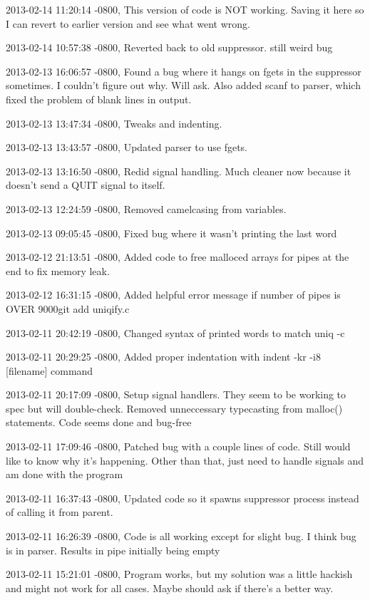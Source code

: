 \documentclass[letterpaper,10pt,titlepage]{article}
\begin{document}
\begin{enumerate}
2013-02-14 11:20:14 -0800, This version of code is NOT working. Saving it here so I can revert to earlier version and see what went wrong.

2013-02-14 10:57:38 -0800, Reverted back to old suppressor. still weird bug

2013-02-13 16:06:57 -0800, Found a bug where it hangs on fgets in the suppressor sometimes. I couldn't figure out why. Will ask. Also added scanf to parser, which fixed the problem of blank lines in output.

2013-02-13 13:47:34 -0800, Tweaks and indenting.

2013-02-13 13:43:57 -0800, Updated parser to use fgets.

2013-02-13 13:16:50 -0800, Redid signal handling. Much cleaner now because it doesn't send a QUIT signal to itself.

2013-02-13 12:24:59 -0800, Removed camelcasing from variables.

2013-02-13 09:05:45 -0800, Fixed bug where it wasn't printing the last word

2013-02-12 21:13:51 -0800, Added code to free malloced arrays for pipes at the end to fix memory leak.

2013-02-12 16:31:15 -0800, Added helpful error message if number of pipes is OVER 9000git add uniqify.c

2013-02-11 20:42:19 -0800, Changed syntax of printed words to match uniq -c

2013-02-11 20:29:25 -0800, Added proper indentation with indent -kr -i8 [filename] command

2013-02-11 20:17:09 -0800, Setup signal handlers. They seem to be working to spec but will double-check. Removed unneccessary typecasting from malloc() statements. Code seems done and bug-free

2013-02-11 17:09:46 -0800, Patched bug with a couple lines of code. Still would like to know why it's happening. Other than that, just need to handle signals and am done with the program

2013-02-11 16:37:43 -0800, Updated code so it spawns suppressor process instead of calling it from parent.

2013-02-11 16:26:39 -0800, Code is all working except for slight bug. I think bug is in parser. Results in pipe initially being empty

2013-02-11 15:21:01 -0800, Program works, but my solution was a little hackish and might not work for all cases. Maybe should ask if there's a better way.


\end{enumerate}
\end{document}
